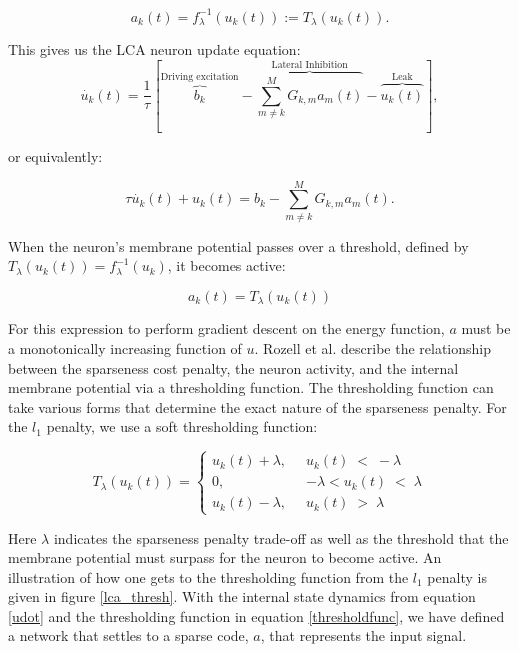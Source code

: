 \begin{displaymath}\label{athresh}
    a_{k}(t) = f_{\lambda}^{-1}(u_{k}(t)) := T_{\lambda}(u_{k}(t)).
\end{displaymath}

This gives us the LCA neuron update equation:
\begin{equation}\label{udot}
    \dot{u_{k}}(t) = \frac{1}{\tau} \left[\overbrace{b_{k}}^\text{Driving excitation} - \overbrace{\sum_{m \neq k}^{M}G_{k,m}a_{m}(t)}^\text{Lateral Inhibition} - \overbrace{u_{k}(t)}^\text{Leak} \right],
\end{equation}

\noindent or equivalently:

\begin{displaymath}
    \tau \dot{u_{k}}(t) + u_{k}(t) =  b_{k} - \sum_{m \neq k}^{M}G_{k,m}a_{m}(t).
\end{displaymath}

When the neuron's membrane potential passes over a threshold, defined by $T_{\lambda}(u_{k}(t)) = f_{\lambda}^{-1}(u_{k})$, it becomes active:

\begin{equation}
a_{k}(t) = T_{\lambda}(u_{k}(t))
\end{equation}

For this expression to perform gradient descent on the energy function, $a$ must be a monotonically increasing function of $u$. Rozell et al. describe the relationship between the sparseness cost penalty, the neuron activity, and the internal membrane potential via a thresholding function. The thresholding function can take various forms that determine the exact nature of the sparseness penalty. For the $l_{1}$ penalty, we use a soft thresholding function:

\begin{equation}
    T_{\lambda}(u_{k}(t)) = \left\{
    \begin{aligned}
        u_{k}(t)+\lambda,\;\; &u_{k}(t)\; <\; -\lambda \\
        0,\;\; &-\lambda < u_{k}(t)\; <\; \lambda \\
        u_{k}(t)-\lambda,\;\; &u_{k}(t)\; >\; \lambda
    \end{aligned}
    \right.
\label{thresholdfunc}
\end{equation}

Here $\lambda$ indicates the sparseness penalty trade-off as well as the threshold that the membrane potential must surpass for the neuron to become active. An illustration of how one gets to the thresholding function from the $l_{1}$ penalty is given in figure \ref{lca_thresh}. With the internal state dynamics from equation \eqref{udot} and the thresholding function in equation \eqref{thresholdfunc}, we have defined a network that settles to a sparse code, $a$, that represents the input signal.

